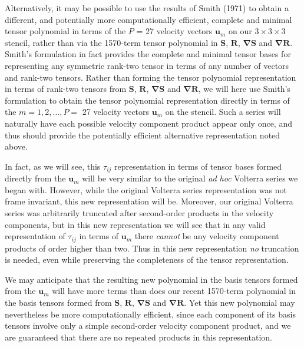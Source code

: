 Alternatively, it may be possible to use the results of Smith (1971) to obtain a different, and potentially more computationally efficient, complete and minimal tensor polynomial in terms of the $P$ = 27 velocity vectors  $\mathbf{u}_{m}$ on our $3 \times 3 \times 3$   stencil, rather than via the 1570-term tensor polynomial in $\mathbf{S}$, $\mathbf{R}$, $\mathbf{\nabla S}$ and $\mathbf{\nabla R}$. Smith’s formulation in fact provides the complete and minimal tensor bases for representing any symmetric rank-two tensor in terms of any number of vectors and rank-two tensors.  Rather than forming the tensor polynomial representation in terms of rank-two tensors from $\mathbf{S}$, $\mathbf{R}$, $\mathbf{\nabla S}$ and $\mathbf{\nabla R}$, we will here use Smith’s formulation to obtain the tensor polynomial representation directly in terms of the  $m = 1, 2,... , P =$ 27 velocity vectors $\mathbf{u}_{m}$ on the stencil.  Such a series will naturally have each possible velocity component product appear only once, and thus should provide the potentially efficient alternative representation noted above.

In fact, as we will see, this $\tau_{ij}$ representation in terms of tensor bases formed directly from the $\mathbf{u}_{m}$ will be very similar to the original \textit{ad hoc} Volterra series we began with.  However, while the original Volterra series representation was not frame invariant, this new representation will be. Moreover, our original Volterra series was arbitrarily truncated after second-order products in the velocity components, but in this new representation we will see that in any valid representation of $\tau_{ij}$  in terms of $\mathbf{u}_{m}$  there \textit{cannot} be any velocity component products of order higher than two. Thus in this new representation \textit{no} truncation is needed, even while preserving the completeness of the tensor representation. 

We may anticipate that the resulting new polynomial in the basis tensors formed from the $\mathbf{u}_{m}$ will have more terms than does our recent 1570-term polynomial in the basis tensors formed from $\mathbf{S}$, $\mathbf{R}$, $\mathbf{\nabla S}$ and $\mathbf{\nabla R}$. Yet this new polynomial may nevertheless be more computationally efficient, since each component of its basis tensors involve only a simple second-order velocity component product, and we are guaranteed that there are no repeated products in this representation. 

